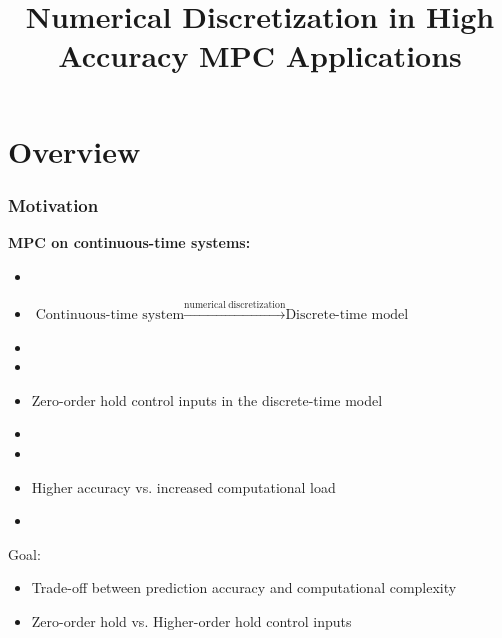\documentclass[student, noshadow, lsr, english, aspectratio=169]{ITR_LSR_slides}
\title{Numerical Discretization in High Accuracy MPC Applications}
\begin{document}
\begin{frame}
    \titlepage
\end{frame}


\section{Overview}

\begin{frame}
	\frametitle{Motivation}
	\textbf{MPC on continuous-time systems:}
	\begin{itemize}
		\item[~]
		\item $\text{Continuous-time system} \xrightarrow{\text{numerical} \ \text{discretization}} \text{Discrete-time model} $
		\item[~]
		\item[~]
		\item Zero-order hold control inputs in the discrete-time model
		\item[~]
		\item[~]
		\item Higher accuracy vs. increased computational load
	\end{itemize}
\begin{itemize}
	\item[~]
\end{itemize}
\begin{block}{Goal:}
	\begin{itemize}
		\item Trade-off between prediction accuracy and computational complexity
		\item Zero-order hold vs. Higher-order hold control inputs
	\end{itemize}
\end{block}
\end{frame}
\end{document}
